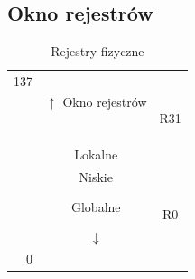 	\subsection{Okno rejestrów}
	    \begin{table}[htbp]
	    	\centering
	    	\caption{Rejestry fizyczne}
	    	\begin{tabular}{r|r|r}
	    		\cline{2-2}    137   & \multirow{6}[2]{*}{$ \uparrow $ Okno rejestrów} &  \bigstrut[t]\\
	    		&       &  \\
	    		&       &  \\
	    		&       &  \bigstrut[b]\\
	    		\cline{2-2}          & \multicolumn{1}{c|}{\multirow{4}[2]{*}{Wysokie}} & \multicolumn{1}{c}{R31} \bigstrut[t]\\
	    		& \multicolumn{1}{c|}{} & \multicolumn{1}{c}{} \\
	    		& \multicolumn{1}{c|}{} & \multicolumn{1}{c}{} \\
	    		& \multicolumn{1}{c|}{} & \multicolumn{1}{c}{} \bigstrut[b]\\
	    		\cline{2-2}          & \multicolumn{1}{c|}{\multirow{4}[2]{*}{Lokalne}} & \multicolumn{1}{c}{} \bigstrut[t]\\
	    		& \multicolumn{1}{c|}{} & \multicolumn{1}{c}{} \\
	    		& \multicolumn{1}{c|}{} & \multicolumn{1}{c}{} \\
	    		& \multicolumn{1}{c|}{} & \multicolumn{1}{c}{} \bigstrut[b]\\
	    		\cline{2-2}          & \multicolumn{1}{c|}{\multirow{4}[2]{*}{Niskie}} & \multicolumn{1}{c}{} \bigstrut[t]\\
	    		& \multicolumn{1}{c|}{} & \multicolumn{1}{c}{} \\
	    		& \multicolumn{1}{c|}{} & \multicolumn{1}{c}{} \\
	    		& \multicolumn{1}{c|}{} & \multicolumn{1}{c}{} \bigstrut[b]\\
	    		\cline{2-2}          & \multicolumn{1}{c|}{\multirow{4}[2]{*}{Globalne}} & \multicolumn{1}{c}{} \bigstrut[t]\\
	    		& \multicolumn{1}{c|}{} & \multicolumn{1}{c}{} \\
	    		& \multicolumn{1}{c|}{} & \multicolumn{1}{c}{} \\
	    		& \multicolumn{1}{c|}{} & \multicolumn{1}{c}{R0} \bigstrut[b]\\
	    		\cline{2-2}          & \multicolumn{1}{c|}{\multirow{2}[2]{*}{$ \downarrow $ }} &  \bigstrut[t]\\
	    		& \multicolumn{1}{c|}{} &  \\
	    		0     & \multicolumn{1}{c|}{} &  \bigstrut[b]\\
	    		\cline{2-2}
	    	\end{tabular}%
	    	\label{tab:addlabel}%
	    \end{table}
	    
